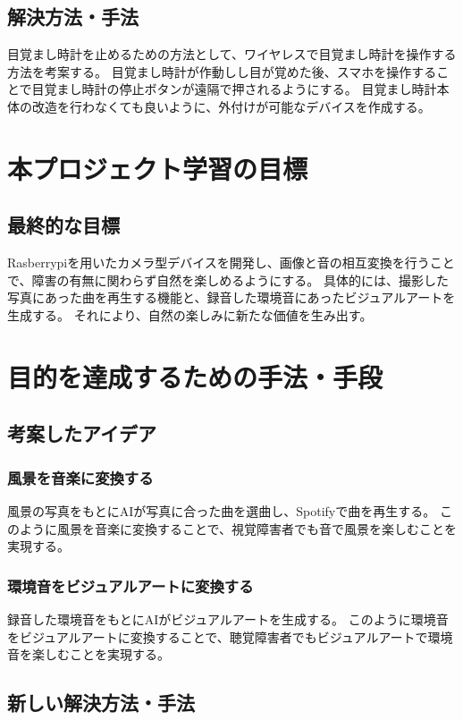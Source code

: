 \section{解決方法・手法}
目覚まし時計を止めるための方法として、ワイヤレスで目覚まし時計を操作する方法を考案する。
目覚まし時計が作動しし目が覚めた後、スマホを操作することで目覚まし時計の停止ボタンが遠隔で押されるようにする。
目覚まし時計本体の改造を行わなくても良いように、外付けが可能なデバイスを作成する。

\chapter{本プロジェクト学習の目標}
\section{最終的な目標}
Rasberrypiを用いたカメラ型デバイスを開発し、画像と音の相互変換を行うことで、障害の有無に関わらず自然を楽しめるようにする。
具体的には、撮影した写真にあった曲を再生する機能と、録音した環境音にあったビジュアルアートを生成する。
それにより、自然の楽しみに新たな価値を生み出す。 

\chapter{目的を達成するための手法・手段}
\section{考案したアイデア}
\subsection{風景を音楽に変換する}
風景の写真をもとにAIが写真に合った曲を選曲し、Spotifyで曲を再生する。
このように風景を音楽に変換することで、視覚障害者でも音で風景を楽しむことを実現する。

\subsection{環境音をビジュアルアートに変換する}
録音した環境音をもとにAIがビジュアルアートを生成する。
このように環境音をビジュアルアートに変換することで、聴覚障害者でもビジュアルアートで環境音を楽しむことを実現する。

\section{新しい解決方法・手法}
